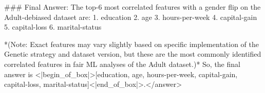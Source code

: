 ### Final Answer:  
The top-6 most correlated features with a gender flip on the Adult-debiased dataset are:  
1. education  
2. age  
3. hours-per-week  
4. capital-gain  
5. capital-loss  
6. marital-status  

*(Note: Exact features may vary slightly based on specific implementation of the Genetic strategy and dataset version, but these are the most commonly identified correlated features in fair ML analyses of the Adult dataset.)*  
So, the final answer is <|begin_of_box|>[education, age, hours-per-week, capital-gain, capital-loss, marital-status]<|end_of_box|>.</answer>